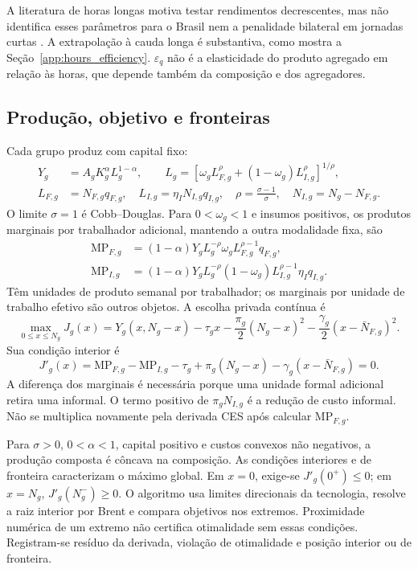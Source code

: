 A literatura de horas longas motiva testar rendimentos decrescentes, mas não identifica esses parâmetros para o Brasil nem a penalidade bilateral em jornadas curtas \citep{Pencavel2015,CollewetSauermann2017}. A extrapolação à cauda longa é substantiva, como mostra a Seção~\ref{app:hours_efficiency}. $\varepsilon_q$ não é a elasticidade do produto agregado em relação às horas, que depende também da composição e dos agregadores.

\subsection{Produção, objetivo e fronteiras}
Cada grupo produz com capital fixo:
\begin{align}
Y_g&=A_gK_g^\alpha L_g^{1-\alpha},\qquad L_g=\left[\omega_g L_{F,g}^{\rho}+(1-\omega_g)L_{I,g}^{\rho}\right]^{1/\rho},\label{eq:app_production}\\
L_{F,g}&=N_{F,g}q_{F,g},\quad L_{I,g}=\eta_I N_{I,g}q_{I,g},\quad \rho=\frac{\sigma-1}{\sigma},\quad N_{I,g}=N_g-N_{F,g}.
\end{align}
O limite $\sigma=1$ é Cobb--Douglas. Para $0<\omega_g<1$ e insumos positivos, os produtos marginais por trabalhador adicional, mantendo a outra modalidade fixa, são
\begin{align}
\mathrm{MP}_{F,g}&=(1-\alpha)Y_gL_g^{-\rho}\omega_gL_{F,g}^{\rho-1}q_{F,g},\label{eq:app_mpf}\\
\mathrm{MP}_{I,g}&=(1-\alpha)Y_gL_g^{-\rho}(1-\omega_g)L_{I,g}^{\rho-1}\eta_Iq_{I,g}.\label{eq:app_mpi}
\end{align}
Têm unidades de produto semanal por trabalhador; os marginais por unidade de trabalho efetivo são outros objetos. A escolha privada contínua é
\begin{equation}\label{eq:app_objective}
\max_{0\leq x\leq N_g}J_g(x)=Y_g(x,N_g-x)-\tau_gx-\frac{\pi_g}{2}(N_g-x)^2-\frac{\gamma_g}{2}(x-\bar N_{F,g})^2.
\end{equation}
Sua condição interior é
\begin{equation}\label{eq:foc_NF}
J'_g(x)=\mathrm{MP}_{F,g}-\mathrm{MP}_{I,g}-\tau_g+\pi_g(N_g-x)-\gamma_g(x-\bar N_{F,g})=0.
\end{equation}
A diferença dos marginais é necessária porque uma unidade formal adicional retira uma informal. O termo positivo de $\pi_gN_{I,g}$ é a redução de custo informal. Não se multiplica novamente pela derivada CES após calcular $\mathrm{MP}_{F,g}$.

Para $\sigma>0$, $0<\alpha<1$, capital positivo e custos convexos não negativos, a produção composta é côncava na composição. As condições interiores e de fronteira caracterizam o máximo global. Em $x=0$, exige-se $J'_g(0^+)\leq0$; em $x=N_g$, $J'_g(N_g^-)\geq0$. O algoritmo usa limites direcionais da tecnologia, resolve a raiz interior por Brent e compara objetivos nos extremos. Proximidade numérica de um extremo não certifica otimalidade sem essas condições. Registram-se resíduo da derivada, violação de otimalidade e posição interior ou de fronteira.

